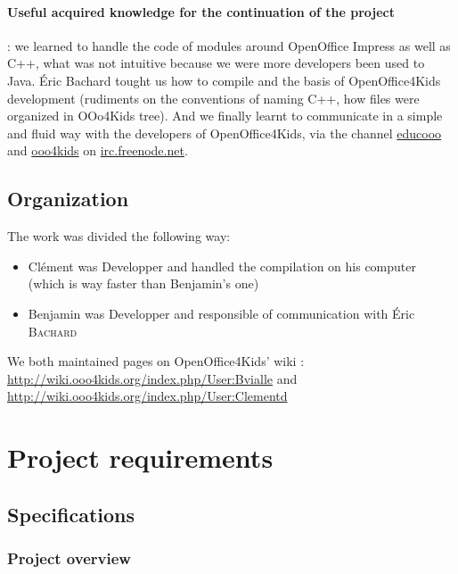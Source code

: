 \documentclass[a4paper,11pt]{article}
\begin{document}
\paragraph{Useful acquired knowledge for the continuation of the project} : we
learned to handle the code of modules around OpenOffice Impress as well as
C++, what was not intuitive because we were more developers been used to Java.
Éric Bachard tought us how to compile and the basis of OpenOffice4Kids
development (rudiments on the conventions of naming C++, how files were
organized in OOo4Kids tree). And we finally learnt to communicate in a simple
and fluid way with the developers of OpenOffice4Kids, via the channel
\url{educooo} and \url{ooo4kids} on \url{irc.freenode.net}.

\subsection*{Organization}

The work was divided the following way:
\begin{itemize}
\item Clément was Developper and handled the compilation on his computer
(which is way faster than Benjamin's one)
\item Benjamin was Developper and responsible of communication with Éric \textsc{Bachard}
\end{itemize}

We both maintained pages on OpenOffice4Kids' wiki :
\url{http://wiki.ooo4kids.org/index.php/User:Bvialle} and
\url{http://wiki.ooo4kids.org/index.php/User:Clementd}

\newpage

\fancyfoot[C]{\thepage}
\section*{Project requirements}

\subsection*{Specifications}


\subsubsection*{Project overview}
\end{document}
